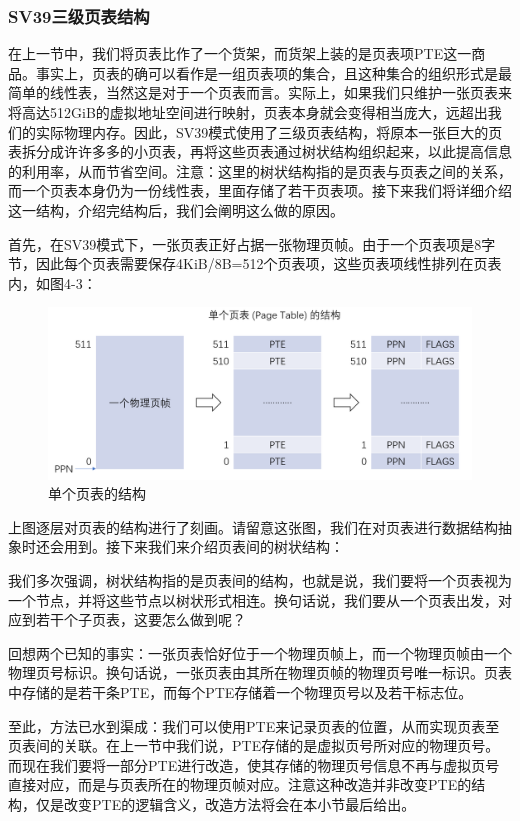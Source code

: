 \subsubsection{SV39三级页表结构}

在上一节中，我们将页表比作了一个货架，而货架上装的是页表项PTE这一商品。事实上，页表的确可以看作是一组页表项的集合，且这种集合的组织形式是最简单的线性表，当然这是对于一个页表而言。实际上，如果我们只维护一张页表来将高达512GiB的虚拟地址空间进行映射，页表本身就会变得相当庞大，远超出我们的实际物理内存。因此，SV39模式使用了三级页表结构，将原本一张巨大的页表拆分成许许多多的小页表，再将这些页表通过树状结构组织起来，以此提高信息的利用率，从而节省空间。注意：这里的树状结构指的是页表与页表之间的关系，而一个页表本身仍为一份线性表，里面存储了若干页表项。接下来我们将详细介绍这一结构，介绍完结构后，我们会阐明这么做的原因。

首先，在SV39模式下，一张页表正好占据一张物理页帧。由于一个页表项是8字节，因此每个页表需要保存4KiB/8B=512个页表项，这些页表项线性排列在页表内，如图4-3：

\begin{figure}[h]
	\centering
	\includegraphics[width=.80\textwidth]{figures/04-01-单个页表的结构.png}
	\caption{单个页表的结构}
\end{figure}\FloatBarrier

上图逐层对页表的结构进行了刻画。请留意这张图，我们在对页表进行数据结构抽象时还会用到。接下来我们来介绍页表间的树状结构：

我们多次强调，树状结构指的是页表间的结构，也就是说，我们要将一个页表视为一个节点，并将这些节点以树状形式相连。换句话说，我们要从一个页表出发，对应到若干个子页表，这要怎么做到呢？

回想两个已知的事实：一张页表恰好位于一个物理页帧上，而一个物理页帧由一个物理页号标识。换句话说，一张页表由其所在物理页帧的物理页号唯一标识。页表中存储的是若干条PTE，而每个PTE存储着一个物理页号以及若干标志位。

至此，方法已水到渠成：我们可以使用PTE来记录页表的位置，从而实现页表至页表间的关联。在上一节中我们说，PTE存储的是虚拟页号所对应的物理页号。而现在我们要将一部分PTE进行改造，使其存储的物理页号信息不再与虚拟页号直接对应，而是与页表所在的物理页帧对应。注意这种改造并非改变PTE的结构，仅是改变PTE的逻辑含义，改造方法将会在本小节最后给出。

